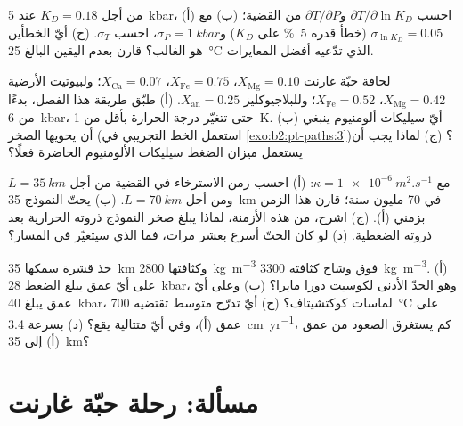 \begin{exercise}[$\star\star$]\label{exo:b2:pt-paths:9}
من أجل $K_D = 0.18$ عند \qty{5}{kbar}، (أ) احسب $\partial T/\partial\ln K_D$
و$\partial T/\partial P$ من القضية؛ (ب) مع $\sigma_{\ln K_D} = 0.05$ (خطأ
قدره \qty{5}{\percent} على $K_D$) و$\sigma_P = \qty{1}{kbar}$، احسب $\sigma_T$.
(ج) أيّ الخطأين هو الغالب؟ قارن بعدم اليقين البالغ \qty{25}{\celsius} الذي تدّعيه
أفضل المعايرات.
\end{exercise}

\begin{exercise}[$\star\star\star$]\label{exo:b2:pt-paths:10}
لحافة حبّة غارنت $X_{\text{Mg}} = 0.10$، $X_{\text{Fe}} = 0.75$، $X_{\text{Ca}} = 0.07$؛
ولبيوتيت الأرضية $X_{\text{Mg}} = 0.42$، $X_{\text{Fe}} = 0.52$؛ وللبلاجيوكليز
$X_{\text{an}} = 0.25$. (أ) طبّق طريقة هذا الفصل، بدءًا من \qty{6}{kbar}،
حتى تتغيّر درجة الحرارة بأقل من \qty{1}{K}. (ب) أيّ سيليكات ألومنيوم ينبغي أن
يحويها الصخر (استعمل الخط التجريبي في \cref{exo:b2:pt-paths:3})؟ (ج) لماذا يجب أن يستعمل ميزان الضغط
سيليكات الألومنيوم الحاضرة فعلًا؟
\end{exercise}

\begin{exercise}[$\star\star\star$]\label{exo:b2:pt-paths:11}
مع $\kappa = \qty{1e-6}{m^2.s^{-1}}$: (أ) احسب زمن الاسترخاء في
القضية من أجل $L = \qty{35}{km}$ ومن أجل $L = \qty{70}{km}$. (ب) يحتّ النموذج
\qty{35}{km} في 70 مليون سنة؛ قارن هذا الزمن بزمني (أ). (ج) اشرح،
من هذه الأزمنة، لماذا يبلغ صخر النموذج ذروته الحرارية بعد ذروته
الضغطية. (د) لو كان الحتّ أسرع بعشر مرات، فما الذي سيتغيّر في المسار؟
\end{exercise}

\begin{exercise}[$\star\star\star$]\label{exo:b2:pt-paths:12}
خذ قشرة سمكها \qty{35}{km} وكثافتها \qty{2800}{kg.m^{-3}} فوق وشاح كثافته
\qty{3300}{kg.m^{-3}}. (أ) على أيّ عمق يبلغ الضغط \qty{28}{kbar}، وهو
الحدّ الأدنى لكوسيت دورا مايرا؟ (ب) وعلى أيّ عمق يبلغ \qty{40}{kbar}، لماسات كوكتشيتاف؟
(ج) أيّ تدرّج متوسط تقتضيه \qty{700}{\celsius} على عمق (أ)، وفي أيّ
متتالية يقع؟ (د) بسرعة \qty{3.4}{cm.yr^{-1}}، كم يستغرق الصعود من عمق
(أ) إلى \qty{35}{km}؟
\end{exercise}

\section{مسألة: رحلة حبّة غارنت}

